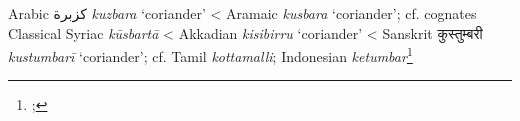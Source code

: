 \begin{etymology}\label{ety:kuzbura}
Arabic {كزبرة} \textit{kuzbara} `coriander'
< Aramaic {} \textit{kusbara} `coriander'; cf. cognates Classical Syriac  \textit{kūsbartā}
< Akkadian {} \textit{kisibirru} `coriander'
< Sanskrit {कुस्तुम्बरी} \textit{kustumbarī} `coriander'; cf. Tamil  \textit{kottamalli}; Indonesian \textit{ketumbar}\footnote{; }
\end{etymology}